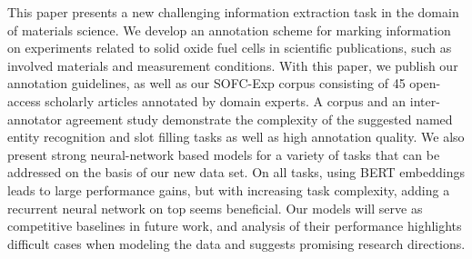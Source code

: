 This paper presents a new challenging information extraction task in the domain of materials science. We develop an annotation scheme for marking information on experiments related to solid oxide fuel cells in scientific publications, such as involved materials and measurement conditions. With this paper, we publish our annotation guidelines, as well as our SOFC-Exp corpus consisting of 45 open-access scholarly articles annotated by domain experts. A corpus and an inter-annotator agreement study demonstrate the complexity of the suggested named entity recognition and slot filling tasks as well as high annotation quality. We also present strong neural-network based models for a variety of tasks that can be addressed on the basis of our new data set. On all tasks, using BERT embeddings leads to large performance gains, but with increasing task complexity, adding a recurrent neural network on top seems beneficial. Our models will serve as competitive baselines in future work, and analysis of their performance highlights difficult cases when modeling the data and suggests promising research directions.
